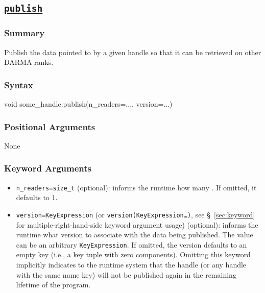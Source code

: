 \clearpage
\subsection{\underline{\texttt{publish}}}
\label{ssec:api_fe_publish}

\hspace{0.1cm} %
\begin{subs}
\vspace{-1.2cm}

\subsubsection{Summary} 
Publish the data pointed to by a given handle so that it can be retrieved on 
other DARMA ranks.

\subsubsection{Syntax} 
\begin{CppCode}
void some_handle.publish(n_readers=..., version=...)
\end{CppCode}

\subsubsection{Positional Arguments} 
None

\subsubsection{Keyword Arguments} 
\begin{itemize}
\item \texttt{n\_readers=size\_t} (optional): informs the runtime how many . If
omitted, it defaults to 1.
\item \texttt{version=KeyExpression} (or \texttt{version(KeyExpression\ldots)},
see \S~\ref{sec:keyword} for multiple-right-hand-side keyword argument usage)
(optional):
informs the runtime what version to associate with the data being published. 
The value can be an arbitrary \texttt{KeyExpression}.
If omitted, the version defaults to an empty key (i.e., a key tuple with zero 
components).  Omitting this keyword implicitly indicates to the runtime system
that the handle (or any handle with the same name key) will not be published
again in the remaining lifetime of the program.
\end{itemize}


\end{subs}
